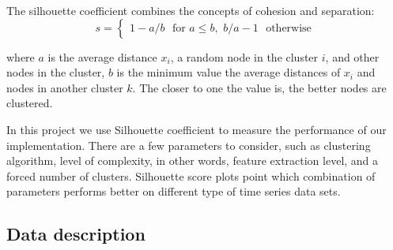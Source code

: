 \documentclass{article}
\begin{document}
The silhouette coefficient combines the concepts of cohesion and separation:\\
\begin{equation}
s = \begin{cases}
1-a/b  \,\,\,\, \mbox{for $a \le b$}  ,\,\,
b/a-1  \,\,\,\, \mbox{otherwise}
\end{cases}
\end{equation}

\noindent where $a$ is the average distance $x_{i}$, a random node in the cluster $i$, and other nodes in the cluster, $b$ is the minimum value the average distances of $x_{i}$ and nodes in another cluster $k$. The closer to one the value is, the better nodes are clustered.

In this project we use Silhouette coefficient to measure the performance of our implementation. There are a few parameters to consider, such as clustering algorithm, level of complexity, in other words, feature extraction level, and a forced number of clusters. Silhouette score plots point which combination of parameters performs better on different type of time series data sets.





\subsection{Data description}
\end{document}
